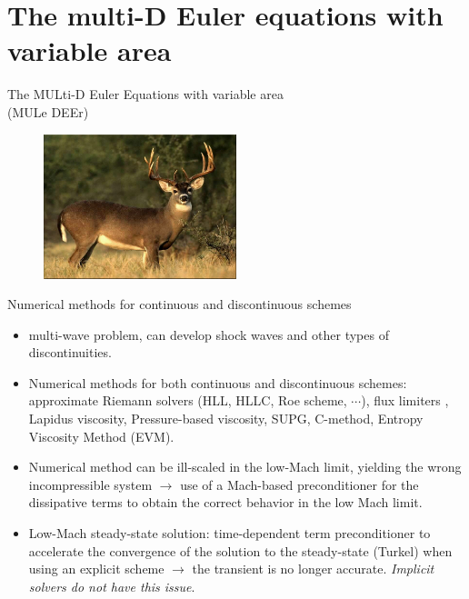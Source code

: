 \documentclass[xcolor=dvipsnames,10pt]{beamer}
\begin{document}
\section{The multi-D Euler equations with variable area}
\begin{frame}
\begin{center}
The MULti-D Euler Equations with variable area \\
(MULe DEEr)
\end{center}
\begin{figure}[H]
\centering
\includegraphics[width=0.5\textwidth]{../figures/Mule_Deer.png}
\end{figure}
\end{frame}
\begin{frame}
\begin{block}{Numerical methods for continuous and discontinuous schemes}
\begin{itemize}
\setlength{\itemsep}{10pt}
\item multi-wave problem, can develop shock waves and other types of discontinuities. 
\item Numerical methods for both continuous and discontinuous schemes: approximate Riemann solvers (HLL, HLLC, Roe scheme, $\cdots$), flux limiters
, Lapidus viscosity, Pressure-based viscosity, SUPG, C-method, Entropy Viscosity Method (EVM). 
\item Numerical method can be ill-scaled in the low-Mach limit, yielding the wrong incompressible system $\to$ use of a Mach-based preconditioner for the dissipative terms to obtain the correct behavior in the low Mach limit.
\item Low-Mach steady-state solution: time-dependent term preconditioner to accelerate the convergence of the solution to the steady-state (Turkel) when using an explicit scheme $\to$ the transient is no longer accurate. \emph{Implicit solvers do not have this issue}. 
\end{itemize}
\end{block}
\end{frame}
\end{document}
